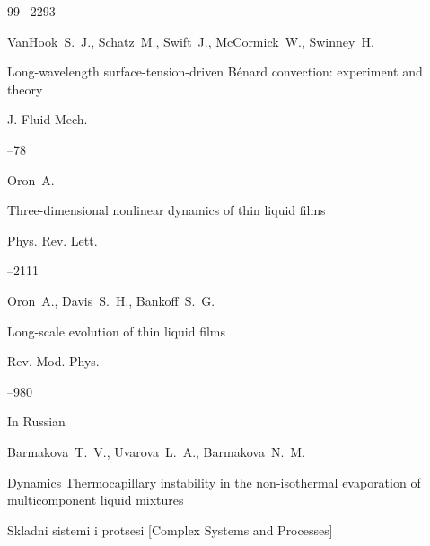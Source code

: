 \begin{thebibliography}{99}
--2293





\by VanHook~S.~J., Schatz~M., Swift~J., McCormick~W., Swinney~H. 

\paper Long-wavelength surface-tension-driven B\'enard convection: experiment and theory

\jour J. Fluid Mech.



--78





\by Oron~A.

\paper Three-dimensional nonlinear dynamics of thin liquid films

\jour Phys. Rev. Lett.




--2111







\by Oron~A., Davis~S.~H., Bankoff~S.~G.

\paper Long-scale evolution of thin liquid films

\jour Rev. Mod. Phys.




--980





\lang In Russian

\by Barmakova~T.~V., Uvarova~L.~A., Barmakova~N.~M.

\paper Dynamics Thermocapillary instability in the non-isothermal evaporation of multicomponent liquid mixtures

\jour Skladni sistemi i protsesi \rm [Complex Systems and Processes]



\end{thebibliography}
